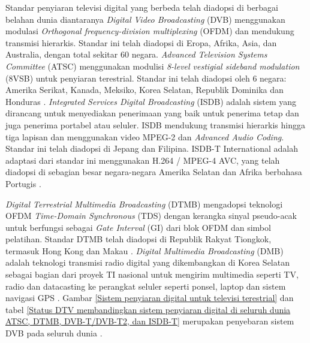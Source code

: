 Standar penyiaran televisi digital yang berbeda telah diadopsi di berbagai belahan dunia diantaranya \textit{Digital Video Broadcasting} (DVB) menggunakan modulasi \textit{Orthogonal frequency-division multiplexing} (OFDM) dan mendukung transmisi hierarkis. Standar ini telah diadopsi di Eropa, Afrika, Asia, dan Australia, dengan total sekitar 60 negara. \textit{Advanced Television Systems Committee} (ATSC) menggunakan modulisi \textit{8-level vestigial sideband modulation} (8VSB) untuk penyiaran terestrial. Standar ini telah diadopsi oleh 6 negara: Amerika Serikat, Kanada, Meksiko, Korea Selatan, Republik Dominika dan Honduras \citep{dtvstatus2017}.  \textit{Integrated Services Digital Broadcasting} (ISDB) adalah sistem yang dirancang untuk menyediakan penerimaan yang baik untuk penerima tetap dan juga penerima portabel atau seluler. ISDB mendukung transmisi hierarkis hingga tiga lapisan dan menggunakan video MPEG-2 dan \textit{Advanced Audio Coding}. Standar ini telah diadopsi di Jepang dan Filipina. ISDB-T International adalah adaptasi dari standar ini menggunakan H.264 / MPEG-4 AVC, yang telah diadopsi di sebagian besar negara-negara Amerika Selatan dan Afrika berbahasa Portugis \citep{Ong2010}.


\textit{Digital Terrestrial Multimedia Broadcasting} (DTMB) mengadopsi teknologi OFDM \textit{Time-Domain Synchronous} (TDS) dengan kerangka sinyal pseudo-acak untuk berfungsi sebagai \textit{Gate Interval} (GI) dari blok OFDM dan simbol pelatihan. Standar DTMB telah diadopsi di Republik Rakyat Tiongkok, termasuk Hong Kong dan Makau \citep{Ong2010}. \textit{Digital Multimedia Broadcasting} (DMB) adalah teknologi transmisi radio digital yang dikembangkan di Korea Selatan sebagai bagian dari proyek TI nasional untuk mengirim multimedia seperti TV, radio dan datacasting ke perangkat seluler seperti ponsel, laptop dan sistem navigasi GPS \citep{Baek_2008}. Gambar \ref{Sistem penyiaran digital untuk televisi terestrial} dan tabel \ref{Status DTV membandingkan sistem penyiaran digital di seluruh dunia ATSC, DTMB, DVB-T/DVB-T2, dan ISDB-T} merupakan penyebaran sistem DVB pada seluruh dunia \citep{dtvstatus2017}.

